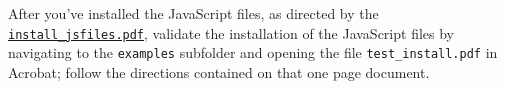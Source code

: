 \documentclass{article}
\makeatletter
\renewcommand{\paragraph}
    {\@startsection{paragraph}{4}{0pt}{6pt}{-3pt}
    {\normalfont\normalsize\bfseries}}
\let\app\textsf
\edef\amtIndent{\the\parindent}
\makeatother
\begin{document}
After you've installed the JavaScript files, as directed by the
\texttt{\href{install_jsfiles.pdf}{install\_jsfiles.pdf}}, validate the
installation of the JavaScript files by navigating to the \texttt{examples}
subfolder and opening the file \texttt{test\_install.pdf} in \app{Acrobat};
follow the directions contained on that one page document.


\begin{comment}
\paragraph*{Acrobat Pro~8.1 or later.}
Start \textbf{Acrobat Pro~8.1}\footnote{The file will cause no harm if you
install it in an earlier version of Acrobat, as early as version 7.} or
later, and open the console window \textsf{Advanced \texttt> JavaScript
\texttt> Debugger} (\texttt{Ctrl+J} for Windows or \texttt{Cmd+J} for Mac
OS). Copy and paste the following code into the window.
\begin{Verbatim}[xleftmargin=\amtIndent]
app.getPath("user","javascript");
\end{Verbatim}
Now, with the mouse cursor on the line containing this script, press
the \texttt{Ctrl+Enter} key. This will execute this JavaScript. This
JavaScript method returns the path to where \texttt{aeb.js} should
be placed. For example, on my system, the return string is
\begin{Verbatim}[xleftmargin=\amtIndent,fontsize=\small]
/C/Documents and Settings/story/
    Application Data/Adobe/Acrobat/8.0/JavaScripts
\end{Verbatim}
Follow the path to this folder. If the \texttt{JavaScripts} folder
does not exist, create it.  Finally, copy \texttt{aeb.js}
into this folder. The file is read each time Acrobat starts.

\paragraph*{Acrobat Pro 10.1.1 for Windows only.} For this version of \textbf{Acrobat},
things have tightened up even more. The user JavaScripts folder has moved to
\begin{Verbatim}[xleftmargin=\amtIndent,fontsize=\small]
%AppData%\Adobe\Acrobat\Privileged\10.0\JavaScripts
\end{Verbatim}
\exAeBBlogArticle{p=737}where \verb!%AppData%! is an environment variable defined by Acrobat. For details
of how to install the folder JavaScripts in the new location, see my blog
article \mlhref{http://www.acrotex.net/blog/?p=737}{Acrobat Security Changes in 10.1.1 and
Acro\!\TeX}.
\end{comment}
\end{document}

